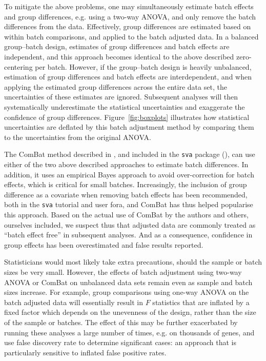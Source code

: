 \documentclass{bio}
\begin{document}
To mitigate the above problems, one may simultaneously estimate batch effects and group differences, e.g. using a two-way ANOVA, and only remove the batch differences from the data. Effectively, group differences are estimated based on within batch comparisons, and applied to the batch adjusted data. In a balanced group--batch design, estimates of group differences and batch effects are independent, and this approach becomes identical to the above described zero-centering per batch. However, if the group--batch design is heavily unbalanced, estimation of group differences and batch effects are interdependent, and when applying the estimated group differences across the entire data set, the uncertainties of these estimates are ignored. Subsequent analyses will then systematically underestimate the statistical uncertainties and exaggerate the confidence of group differences. Figure~\ref{fig:boxplots} illustrates how statistical uncertainties are deflated by this batch adjustment method by comparing them to the uncertainties from the original ANOVA.

The ComBat method described in \citet{Johnson2007}, and included in the \texttt{sva} package (\citealp{Leek2012}), can use either of the two above described approaches to estimate batch differences. In addition, it uses an empirical Bayes approach to avoid over-correction for batch effects, which is critical for small batches. Increasingly, the inclusion of group difference as a covariate when removing batch effects has been recommended, both in the \texttt{sva} tutorial and user fora, and ComBat has thus helped popularise this approach. Based on the actual use of ComBat by the authors and others, ourselves included, we suspect thus that adjusted data are commonly treated as ``batch effect free'' in subsequent analyses. And as a consequence, confidence in group effects has been overestimated and false results reported.

Statisticians would most likely take extra precautions, should the sample or batch sizes be very small. However, the effects of batch adjustment using two-way ANOVA or ComBat on unbalanced data sets remain even as sample and batch sizes increase. For example, group comparisons using one-way ANOVA on the batch adjusted data will essentially result in $F$ statistics that are inflated by a fixed factor which depends on the unevenness of the design, rather than the size of the sample or batches. The effect of this may be further exacerbated by running these analyses a large number of times, e.g. on thousands of genes, and use false discovery rate to determine significant cases: an approach that is particularly sensitive to inflated false positive rates.
\end{document}
